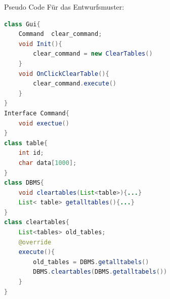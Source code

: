 \begin{parlist}
\begin{center}
  \end{center}
   \item Pseudo Code Für das Entwurfsmuster: 
\begin{lstlisting}[language=java, frame=trBL]
class Gui{
	Command  clear_command; 
	void Init(){
		clear_command = new ClearTables()
	}
	void OnClickClearTable(){
		clear_command.execute()
	}
}
Interface Command{
	void exectue()
}
class table{
	int id;
	char data[1000];
}
class DBMS{
	void cleartables(List<table>){...}
	List< table> getalltables(){...}
}
class cleartables{
	List<tables> old_tables;
	@override
	execute(){
		old_tables = DBMS.getalltabels()
		DBMS.cleartables(DBMS.getalltabels())
	}
}
\end{lstlisting}
\end{parlist}
